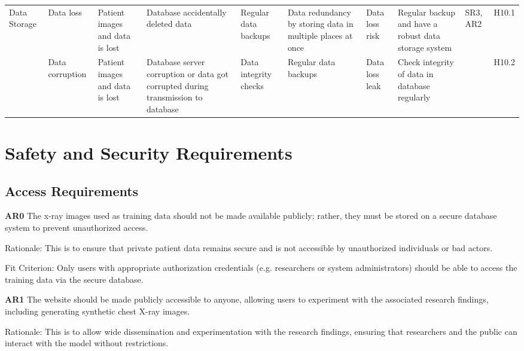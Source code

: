 \documentclass{article}
\begin{document}
\begin{landscape}
\begin{table}[hp]
\begin{footnotesize}
\begin{tabular}{|p{1in}|p{1in}|p{1in}|p{1.5in}|p{0.6in}|p{0.8in}|p{0.7in}|p{1.8in}|p{0.2in}|p{0.2in}|}
        \multirow{2}{1in}{Data Storage} &
        Data loss &
        Patient images and data is lost &
        Database accidentally deleted data &
        Regular data backups &
        Data redundancy by storing data in multiple places at once &
        Data loss risk &
        Regular backup and have a robust data storage system &
        \multirow{2}{0.2in}{SR3, AR2} &
        H10.1 \\
        \cline{2-8}\cline{10-10}
        &
        Data corruption &
        Patient images and data is lost &
        Database server corruption or data got corrupted during transmission to database &
        Data integrity checks &
        Regular data backups &
        Data loss leak &
        Check integrity of data in database regularly & &
        H10.2 \\
        \bottomrule
      \end{tabular}
    \end{footnotesize}
  \end{table}
\end{landscape}
\restoregeometry

\section{Safety and Security Requirements}

\subsection{Access Requirements}
\textbf{AR0} The x-ray images used as training data should not be made available publicly; rather,
they must be stored on a secure database system to prevent unauthorized access.

Rationale: This is to ensure that private patient data remains secure and is not accessible by
unauthorized individuals or bad actors.

Fit Criterion: Only users with appropriate authorization credentials (e.g. researchers or system
administrators) should be able to access the training data via the secure database.

\textbf{AR1} The website should be made publicly accessible to anyone, allowing users to
experiment with the associated research findings, including generating synthetic chest X-ray
images.

Rationale: This is to allow wide dissemination and experimentation with the research findings,
ensuring that researchers and the public can interact with the model without restrictions.
\end{document}
